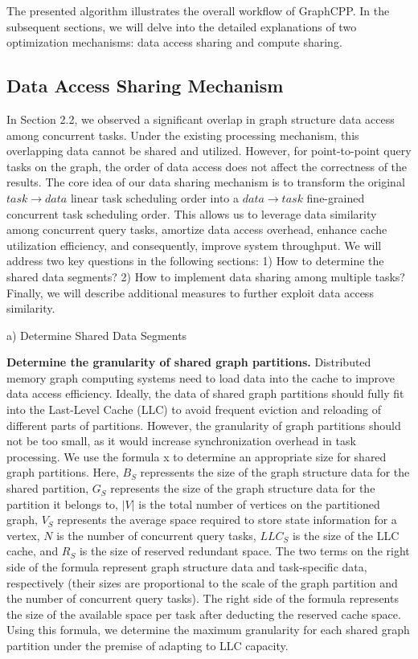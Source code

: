 \documentclass[lettersize,journal]{IEEEtran} %
\begin{document}
The presented algorithm illustrates the overall workflow of GraphCPP. In the subsequent sections, we will delve into the detailed explanations of two optimization mechanisms: data access sharing and compute sharing.

\subsection{Data Access Sharing Mechanism}
In Section 2.2, we observed a significant overlap in graph structure data access among concurrent tasks. Under the existing processing mechanism, this overlapping data cannot be shared and utilized. However, for point-to-point query tasks on the graph, the order of data access does not affect the correctness of the results. The core idea of our data sharing mechanism is to transform the original $task \rightarrow data$ linear task scheduling order into a $data \rightarrow task$ fine-grained concurrent task scheduling order. This allows us to leverage data similarity among concurrent query tasks, amortize data access overhead, enhance cache utilization efficiency, and consequently, improve system throughput. We will address two key questions in the following sections: 1) How to determine the shared data segments? 2) How to implement data sharing among multiple tasks? Finally, we will describe additional measures to further exploit data access similarity.

a) Determine Shared Data Segments

{\bf{Determine the granularity of shared graph partitions.}} Distributed memory graph computing systems need to load data into the cache to improve data access efficiency. Ideally, the data of shared graph partitions should fully fit into the Last-Level Cache (LLC) to avoid frequent eviction and reloading of different parts of partitions. However, the granularity of graph partitions should not be too small, as it would increase synchronization overhead in task processing. We use the formula x to determine an appropriate size for shared graph partitions. Here, $B_S$ repressents the size of the graph structure data for the shared partition, $G_S$ represents the size of the graph structure data for the partition it belongs to, $|V|$ is the total number of vertices on the partitioned graph, $V_S$ represents the average space required to store state information for a vertex, $N$ is the number of concurrent query tasks, $LLC_S$ is the size of the LLC cache, and $R_S$ is the size of reserved redundant space. The two terms on the right side of the formula represent graph structure data and task-specific data, respectively (their sizes are proportional to the scale of the graph partition and the number of concurrent query tasks). The right side of the formula represents the size of the available space per task after deducting the reserved cache space. Using this formula, we determine the maximum granularity for each shared graph partition under the premise of adapting to LLC capacity.
\end{document}
